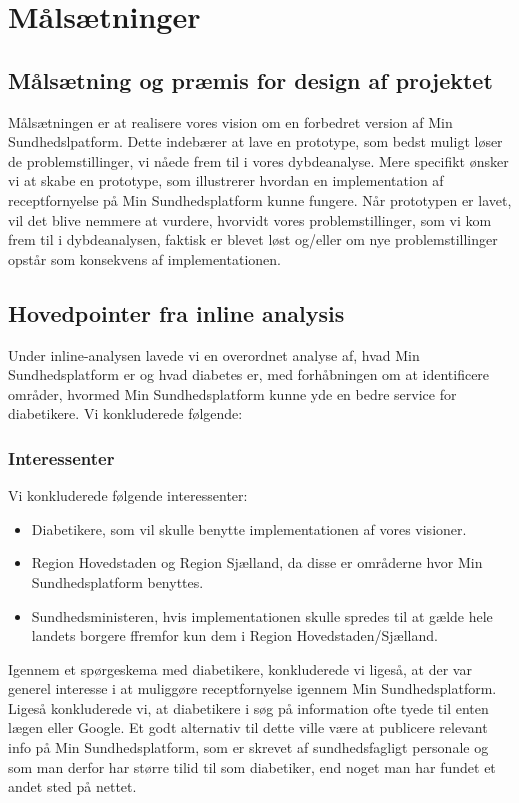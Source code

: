 \section{Målsætninger}
\subsection{Målsætning og præmis for design af projektet}
Målsætningen er at realisere vores vision om en forbedret version af Min Sundhedslpatform. Dette indebærer at lave en prototype, som bedst muligt løser de problemstillinger, vi nåede frem til i vores dybdeanalyse. Mere specifikt ønsker vi at skabe en prototype, som illustrerer hvordan en implementation af receptfornyelse på Min Sundhedsplatform kunne fungere. Når prototypen er lavet, vil det blive nemmere at vurdere, hvorvidt vores problemstillinger, som vi kom frem til i dybdeanalysen, faktisk er blevet løst og/eller om nye problemstillinger opstår som konsekvens af implementationen. 
\subsection{Hovedpointer fra inline analysis}
Under inline-analysen lavede vi en overordnet analyse af, hvad Min Sundhedsplatform er og hvad diabetes er, med forhåbningen om at identificere områder, hvormed Min Sundhedsplatform kunne yde en bedre service for diabetikere. Vi konkluderede følgende:
\subsubsection{Interessenter}
Vi konkluderede følgende interessenter:
\begin{itemize}
\item Diabetikere, som vil skulle benytte implementationen af vores visioner.
\item Region Hovedstaden og Region Sjælland, da disse er områderne hvor Min Sundhedsplatform benyttes.
\item Sundhedsministeren, hvis implementationen skulle spredes til at gælde hele landets borgere ffremfor kun dem i Region Hovedstaden/Sjælland.
\end{itemize}
Igennem et spørgeskema med diabetikere, konkluderede vi ligeså, at der var generel interesse i at muliggøre receptfornyelse igennem Min Sundhedsplatform. Ligeså konkluderede vi, at diabetikere i søg på information ofte tyede til enten lægen eller Google. Et godt alternativ til dette ville være at publicere relevant info på Min Sundhedsplatform, som er skrevet af sundhedsfagligt personale og som man derfor har større tilid til som diabetiker, end noget man har fundet et andet sted på nettet. 
